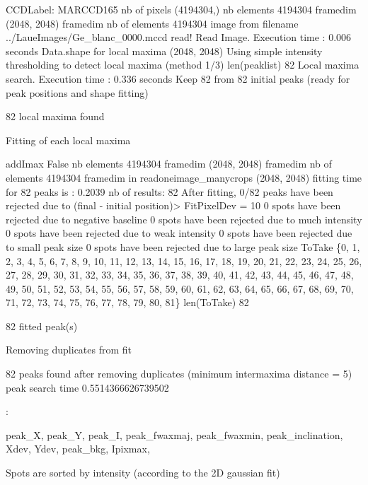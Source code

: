 \documentclass[letterpaper,10pt,english]{sphinxmanual}
\begin{document}
\begin{sphinxalltt}
CCDLabel:  MARCCD165
nb of pixels (4194304,)
nb elements 4194304
framedim (2048, 2048)
framedim nb of elements 4194304
image from filename ../LaueImages/Ge\_blanc\_0000.mccd read!
Read Image. Execution time : 0.006 seconds
Data.shape for local maxima (2048, 2048)
Using simple intensity thresholding to detect local maxima (method 1/3)
len(peaklist) 82
Local maxima search. Execution time : 0.336 seconds
Keep 82 from 82 initial peaks (ready for peak positions and shape fitting)

\sphinxstylestrong{*************}
82 local maxima found

 Fitting of each local maxima

addImax False
nb elements 4194304
framedim (2048, 2048)
framedim nb of elements 4194304
framedim in readoneimage\_manycrops (2048, 2048)
fitting time for 82 peaks is : 0.2039
nb of results:  82
After fitting, 0/82 peaks have been rejected
 due to (final - initial position)\textgreater{} FitPixelDev = 10
0 spots have been rejected
 due to negative baseline
0 spots have been rejected
 due to much intensity
0 spots have been rejected
 due to weak intensity
0 spots have been rejected
 due to small peak size
0 spots have been rejected
 due to large peak size
ToTake \{0, 1, 2, 3, 4, 5, 6, 7, 8, 9, 10, 11, 12, 13, 14, 15, 16, 17, 18, 19, 20, 21, 22, 23, 24, 25, 26, 27, 28, 29, 30, 31, 32, 33, 34, 35, 36, 37, 38, 39, 40, 41, 42, 43, 44, 45, 46, 47, 48, 49, 50, 51, 52, 53, 54, 55, 56, 57, 58, 59, 60, 61, 62, 63, 64, 65, 66, 67, 68, 69, 70, 71, 72, 73, 74, 75, 76, 77, 78, 79, 80, 81\}
len(ToTake) 82

82 fitted peak(s)

Removing duplicates from fit

82 peaks found after removing duplicates (minimum intermaxima distance = 5)
peak search time 0.5514366626739502
\end{sphinxalltt}

:

peak\_X, peak\_Y, peak\_I, peak\_fwaxmaj, peak\_fwaxmin,
peak\_inclination, Xdev, Ydev, peak\_bkg, Ipixmax,

Spots are sorted by intensity (according to the 2D gaussian fit)

%
\begin{sphinxVerbatim}[commandchars=\\\{\}]
\PYG{p}{[}\PYG{p}{]}
\PYG{p}{[}\PYG{p}{]}
\end{sphinxVerbatim}
\end{document}
